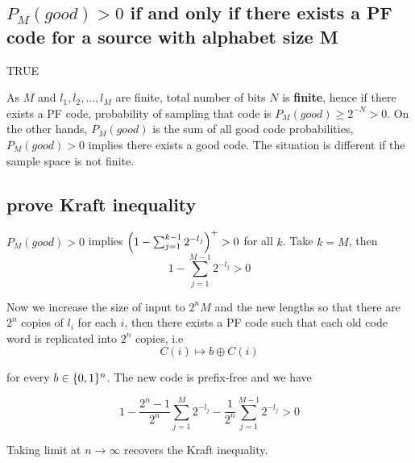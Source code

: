 \documentclass{article}
\begin{document}
\subsection{$P_M (good) > 0$ if and only if there exists a PF code for a source with alphabet size M}

TRUE

As $M$ and $l_1, l_2, ..., l_M$ are finite, total number of bits $N$ is \textbf{finite}, hence if there exists a PF code, probability of sampling that code is $P_M(good) \geq 2^{-N} > 0$. On the other hands, $P_M(good)$ is the sum of all good code probabilities, $P_M(good) > 0$ implies there exists a good code. The situation is different if the sample space is not finite.

\subsection{prove Kraft inequality}

$P_M (good) > 0$ implies $\tuple*{1 - \sum_{j=1}^{k-1} 2^{-l_j}}^+ > 0$ for all $k$. Take $k=M$, then 
$$
    1 - \sum_{j=1}^{M - 1} 2^{-l_j} > 0
$$

Now we increase the size of input to $2^n M$ and the new lengths so that there are $2^n$ copies of $l_i$ for each $i$, then there exists a PF code such that each old code word is replicated into $2^n$ copies, i.e
$$
    C(i) \mapsto b \oplus C(i)
$$

for every $b \in \set{0, 1}^n$. The new code is prefix-free and we have

$$
    1 - \frac{2^n - 1}{2^n} \sum_{j=1}^{M} 2^{-l_j} - \frac{1}{2^n} \sum_{j=1}^{M-1} 2^{-l_j} > 0
$$

Taking limit at $n \to \infty$ recovers the Kraft inequality.
\end{document}
